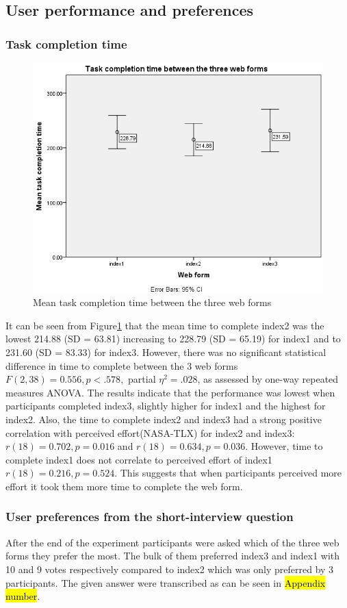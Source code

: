 \documentclass[a4paper]{report}
\begin{document}
		\subsection{User performance and preferences}
			\subsubsection{Task completion time}		
			\begin{figure}[h]
				\centering
				\includegraphics[width=0.7\linewidth]{mean-task-completion-time}
				\caption[Task completion time between the three web forms]{Mean task completion time between the three web forms}
				\label{fig:mean-task-completion-time}
			\end{figure}
			It can be seen from Figure\ref{fig:mean-task-completion-time} that the mean time to complete index2 was the lowest 214.88 (SD = 63.81) increasing to 228.79 (SD = 65.19) for index1 and to 231.60 (SD = 83.33) for index3. However, there was no significant statistical difference in time to complete between the 3 web forms $F(2,38)=0.556, p<.578,$ partial $\eta^{2}=.028$, as assessed by one-way repeated measures ANOVA. The results indicate that the performance was lowest when participants completed index3, slightly higher for index1 and the highest for index2.
			Also, the time to complete index2 and index3 had a strong positive correlation with perceived effort(NASA-TLX) for index2 and index3: $r(18)=0.702, p=0.016$ and $r(18)=0.634, p=0.036$. However, time to complete index1 does not correlate to perceived effort of index1 $r(18)=0.216, p=0.524$. This suggests that when participants perceived more effort it took them more time to complete the web form.
			\subsubsection{User preferences from the short-interview question}
			After the end of the experiment participants were asked which of the three web forms they prefer the most. The bulk of them preferred index3 and index1 with 10 and 9 votes respectively compared to index2 which was only preferred by 3 participants. The given answer were transcribed as can be seen in \hl{Appendix number}. 
\end{document}
